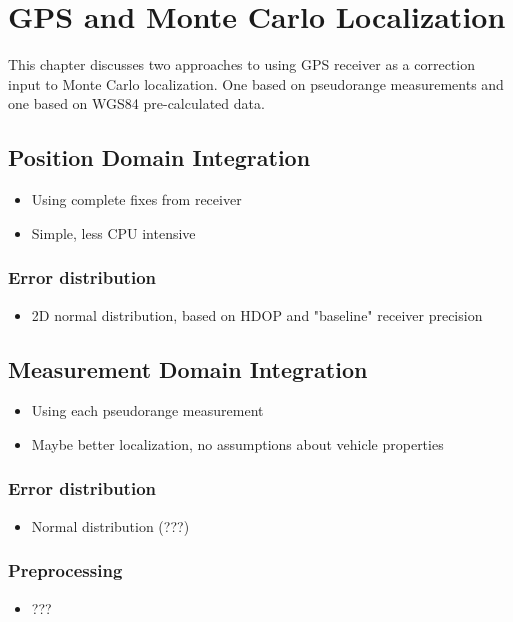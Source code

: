 \chapter{GPS and Monte Carlo Localization}
\label{chap:gps_and_mcl}

This chapter discusses two approaches to using GPS receiver as a correction input
to Monte Carlo localization. One based on pseudorange measurements and one based on
WGS84 pre-calculated data.

\section{Position Domain Integration}
\begin{itemize}
\item Using complete fixes from receiver
\item Simple, less CPU intensive
\end{itemize}

\subsection{Error distribution}
\begin{itemize}
\item 2D normal distribution, based on HDOP and "baseline" receiver precision
\end{itemize}

\section{Measurement Domain Integration}
\begin{itemize}
\item Using each pseudorange measurement
\item Maybe better localization, no assumptions about vehicle properties
\end{itemize}

\subsection{Error distribution}
\begin{itemize}
\item Normal distribution (???)
\end{itemize}

\subsection{Preprocessing}
\begin{itemize}
\item ???
\end{itemize}

